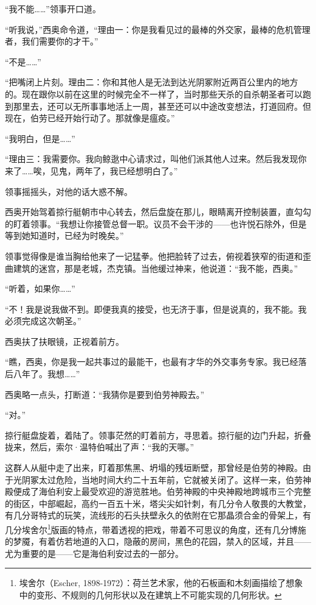 \documentclass[AutoFakeBold=true]{book}
\begin{document}
``我不能……''领事开口道。

``听我说，''西奥命令道，``理由一：你是我看见过的最棒的外交家，最棒的危机管理者，我们需要你的才干。''

``不是……''

``把嘴闭上片刻。理由二：你和其他人是无法到达光阴冢附近两百公里内的地方的。现在跟你以前在这里的时候完全不一样了，当时那些天杀的自杀朝圣者可以跑到那里去，还可以无所事事地活上一周，甚至还可以中途改变想法，打道回府。但现在，伯劳已经开始行动了。那就像是瘟疫。''

``我明白，但是……''

``理由三：我需要你。我向鲸逖中心请求过，叫他们派其他人过来。然后我发现你来了……唉，见鬼，两年了，我已经想明白了。''

领事摇摇头，对他的话大惑不解。

西奥开始驾着掠行艇朝市中心转去，然后盘旋在那儿，眼睛离开控制装置，直勾勾的盯着领事。``我想让你接管总督一职。议员不会干涉的——也许悦石除外，但是等到她知道时，已经为时晚矣。''

领事觉得像是谁当胸给他来了一记猛拳。他把脸转了过去，俯视着狭窄的街道和歪曲建筑的迷宫，那是老城，杰克镇。当他缓过神来，他说道：``我不能，西奥。''

``听着，如果你……''

``不！我是说我做不到。即便我真的接受，也无济于事，但是说真的，我不能。我必须完成这次朝圣。''

西奥扶了扶眼镜，正视着前方。

``瞧，西奥，你是我一起共事过的最能干，也最有才华的外交事务专家。我已经落后八年了。我想……''

西奥略一点头，打断道：``我猜你是要到伯劳神殿去。''

``对。''

掠行艇盘旋着，着陆了。领事茫然的盯着前方，寻思着。掠行艇的边门升起，折叠拢来，然后，索尔·温特伯喊出了声：``我的天哪。''

这群人从艇中走了出来，盯着那焦黑、坍塌的残垣断壁，那曾经是伯劳的神殿。由于光阴冢太过危险，当地时间大约二十五年前，它就被关闭了。这样一来，伯劳神殿便成了海伯利安上最受欢迎的游览胜地。伯劳神殿的中央神殿地跨城市三个完整的街区，中部崛起，高约一百五十米，塔尖尖如针刺，有几分令人敬畏的大教堂，有几分哥特式的玩笑，流线形的石头扶壁永久的依附在它那晶须合金的骨架上，有几分埃舍尔\footnote{埃舍尔（Escher, 1898-1972）：荷兰艺术家，他的石板画和木刻画描绘了想象中的变形、不规则的几何形状以及在建筑上不可能实现的几何形状。}版画的特点，带着透视的把戏，带着不可思议的角度，还有几分博施的梦魇，有着仿若地道的入口，隐蔽的房间，黑色的花园，禁入的区域，并且——尤为重要的是——它是海伯利安过去的一部分。
\end{document}

